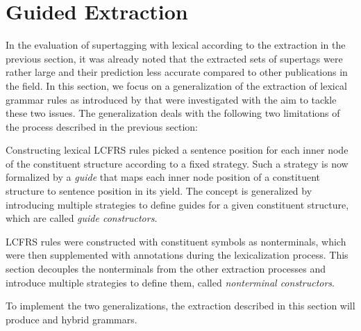 \documentclass[../document.tex]{subfiles}
\begin{document}
    \section{Guided Extraction} \label{sec:extraction:guided}
    In the evaluation of supertagging with lexical  according to the extraction in the previous section, it was already noted that the extracted sets of supertags were rather large and their prediction less accurate compared to other publications in the field. \cite{RupMoe21}
    In this section, we focus on a generalization of the extraction of lexical grammar rules as introduced by \citet{Rup22} that were investigated with the aim to tackle these two issues.
    The generalization deals with the following two limitations of the process described in the previous section:
    \begin{compactenum}
        \item
            Constructing lexical LCFRS rules picked a sentence position for each inner node of the constituent structure according to a fixed strategy.
            Such a strategy is now formalized by a \emph{guide} that maps each inner node position of a constituent structure to sentence position in its yield.
            The concept is generalized by introducing multiple strategies to define guides for a given constituent structure, which are called \emph{guide constructors}.
        \item
            LCFRS rules were constructed with constituent symbols as nonterminals, which were then supplemented with annotations during the lexicalization process.
            This section decouples the nonterminals from the other extraction processes and introduce multiple strategies to define them, called \emph{nonterminal constructors}.
    \end{compactenum}
    To implement the two generalizations, the extraction described in this section will produce  and hybrid grammars.
\end{document}
